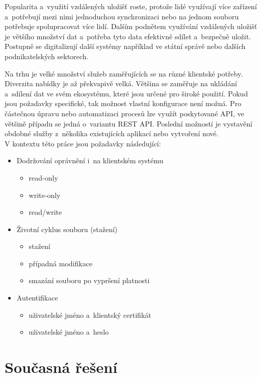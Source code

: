Popularita a využití vzdálených uložišť roste, protože lidé využívají více zařízení a potřebují mezi nimi jednoduchou synchronizaci nebo na jednom souboru
potřebuje spolupracovat více lidí. Dalším podnětem využívání vzdálených uložišť je většího množství dat a potřeba tyto data efektivně sdílet a bezpečně uložit.
Postupně se digitalizují další systémy například ve státní správě nebo dalších podnikatelských sektorech. 

Na trhu je velké množství služeb zaměřujících se na různé klientské potřeby. Diverzita nabídky je až překvapivě velká. Většina se zaměřuje na ukládání a sdílení
dat ve svém ekosystému, které jsou určené pro široké použití. Pokud jsou požadavky specifické, tak možnost vlastní konfigurace není možná. Pro částečnou úpravu 
nebo automatizaci procesů lze využít poskytované API, ve většině případu se jedná o variantu REST API. Poslední možností je vystavění obdobné služby z několika
existujících aplikací nebo vytvoření nové.\\

\noindent V kontextu této práce jsou požadavky následující: 

\begin{itemize}
    \item Dodržování oprávnění i na klientském systému
    \begin{itemize}
        \item read-only
        \item write-only
        \item read/write
    \end{itemize}
    \item Životní cyklus souboru (stažení)
    \begin{itemize}
        \item stažení
        \item případná modifikace
        \item smazání souboru po vypršení platnosti
    \end{itemize}
    \item Autentifikace
    \begin{itemize}
        \item uživatelské jméno a klientský certifikát
        \item uživatelské jméno a heslo
    \end{itemize}
\end{itemize}

\section{Současná řešení}

